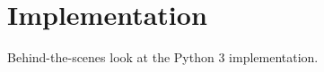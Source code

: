 \section{Implementation}
\label{sec:poise__implementation}

Behind-the-scenes look at the Python 3 implementation.
